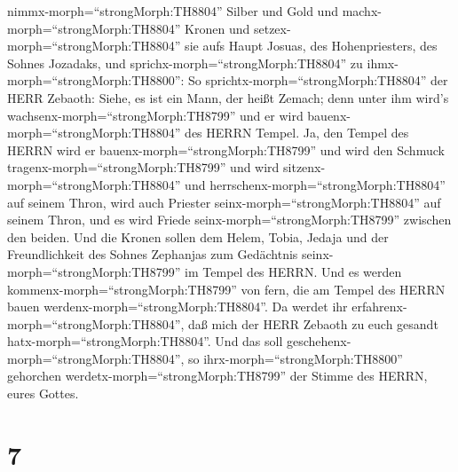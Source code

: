 nimmx-morph=``strongMorph:TH8804'' Silber und Gold und
machx-morph=``strongMorph:TH8804'' Kronen und
setzex-morph=``strongMorph:TH8804'' sie aufs Haupt Josuas, des
Hohenpriesters, des Sohnes Jozadaks,  und
sprichx-morph=``strongMorph:TH8804'' zu
ihmx-morph=``strongMorph:TH8800'': So
sprichtx-morph=``strongMorph:TH8804'' der HERR Zebaoth: Siehe, es ist
ein Mann, der heißt Zemach; denn unter ihm wird's
wachsenx-morph=``strongMorph:TH8799'' und er wird
bauenx-morph=``strongMorph:TH8804'' des HERRN Tempel.  Ja,
den Tempel des HERRN wird er bauenx-morph=``strongMorph:TH8799'' und
wird den Schmuck tragenx-morph=``strongMorph:TH8799'' und wird
sitzenx-morph=``strongMorph:TH8804'' und
herrschenx-morph=``strongMorph:TH8804'' auf seinem Thron, wird auch
Priester seinx-morph=``strongMorph:TH8804'' auf seinem Thron, und es
wird Friede seinx-morph=``strongMorph:TH8799'' zwischen den beiden.
 Und die Kronen sollen dem Helem, Tobia, Jedaja und der
Freundlichkeit des Sohnes Zephanjas zum Gedächtnis
seinx-morph=``strongMorph:TH8799'' im Tempel des HERRN. 
Und es werden kommenx-morph=``strongMorph:TH8799'' von fern, die am
Tempel des HERRN bauen werdenx-morph=``strongMorph:TH8804''. Da werdet
ihr erfahrenx-morph=``strongMorph:TH8804'', daß mich der HERR Zebaoth zu
euch gesandt hatx-morph=``strongMorph:TH8804''. Und das soll
geschehenx-morph=``strongMorph:TH8804'', so
ihrx-morph=``strongMorph:TH8800'' gehorchen
werdetx-morph=``strongMorph:TH8799'' der Stimme des HERRN, eures Gottes.

\hypertarget{section-6}{%
\section{7}\label{section-6}}

